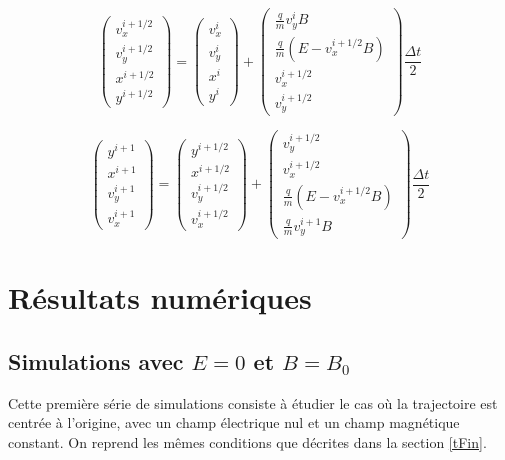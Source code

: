\documentclass[a4paper,12pt,oneside]{article}
\def \be {\begin{equation}}
\def \ee {\end{equation}}
\begin{document}
\be
\left( \begin{array}{c} v_x^{i+1/2} \\ v_y^{i+1/2} \\ x^{i+1/2} \\ y^{i+1/2} \end{array} \right) 
=
\left( \begin{array}{c} v_x^{i} \\ v_y^{i} \\ x^{i} \\ y^{i} \end{array} \right)
+ 
\left( \begin{array}{c} \frac{q}{m} v_y^{i} B \\ \frac{q}{m} (E-v_x^{i+1/2} B) \\ v_x^{i+1/2} \\ v_y^{i+1/2} \end{array} \right) \frac{\Delta t}{2}
\ee

\be
\left( \begin{array}{c} y^{i+1} \\ x^{i+1} \\ v_y^{i+1} \\ v_x^{i+1} \end{array} \right) 
=
\left( \begin{array}{c} y^{i+1/2} \\ x^{i+1/2} \\ v_y^{i+1/2} \\ v_x^{i+1/2} \end{array} \right)
+
\left( \begin{array}{c} v_y^{i+1/2} \\ v_x^{i+1/2} \\ \frac{q}{m} (E-v_x^{i+1/2} B) \\ \frac{q}{m} v_y^{i+1} B \end{array} \right) \frac{\Delta t}{2}
\ee


\newpage
\section{Résultats numériques}
\subsection{Simulations avec $E=0$ et $B=B_0$}
Cette première série de simulations consiste à étudier le cas où la trajectoire est centrée à l'origine, avec un champ électrique nul et un champ magnétique constant. On reprend les mêmes conditions que décrites dans la section \ref{tFin}.
\end{document}
